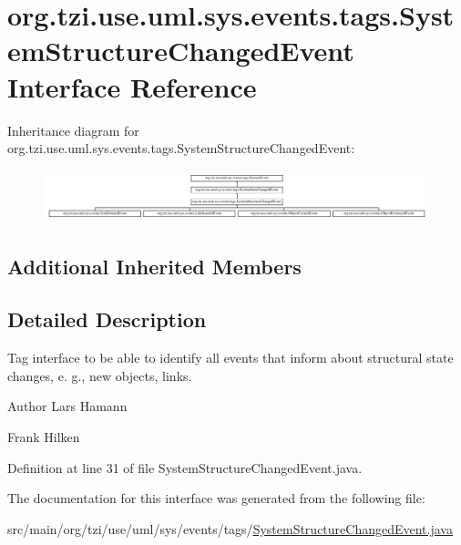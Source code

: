 \hypertarget{interfaceorg_1_1tzi_1_1use_1_1uml_1_1sys_1_1events_1_1tags_1_1_system_structure_changed_event}{\section{org.\-tzi.\-use.\-uml.\-sys.\-events.\-tags.\-System\-Structure\-Changed\-Event Interface Reference}
\label{interfaceorg_1_1tzi_1_1use_1_1uml_1_1sys_1_1events_1_1tags_1_1_system_structure_changed_event}
}
Inheritance diagram for org.\-tzi.\-use.\-uml.\-sys.\-events.\-tags.\-System\-Structure\-Changed\-Event\-:\begin{figure}[H]
\begin{center}
\leavevmode
\includegraphics[height=1.505376cm]{interfaceorg_1_1tzi_1_1use_1_1uml_1_1sys_1_1events_1_1tags_1_1_system_structure_changed_event}
\end{center}
\end{figure}
\subsection*{Additional Inherited Members}


\subsection{Detailed Description}
Tag interface to be able to identify all events that inform about structural state changes, e. g., new objects, links. \begin{DoxyAuthor}{Author}
Lars Hamann 

Frank Hilken 
\end{DoxyAuthor}


Definition at line 31 of file System\-Structure\-Changed\-Event.\-java.



The documentation for this interface was generated from the following file\-:\begin{DoxyCompactItemize}
\item 
src/main/org/tzi/use/uml/sys/events/tags/\hyperlink{_system_structure_changed_event_8java}{System\-Structure\-Changed\-Event.\-java}\end{DoxyCompactItemize}
